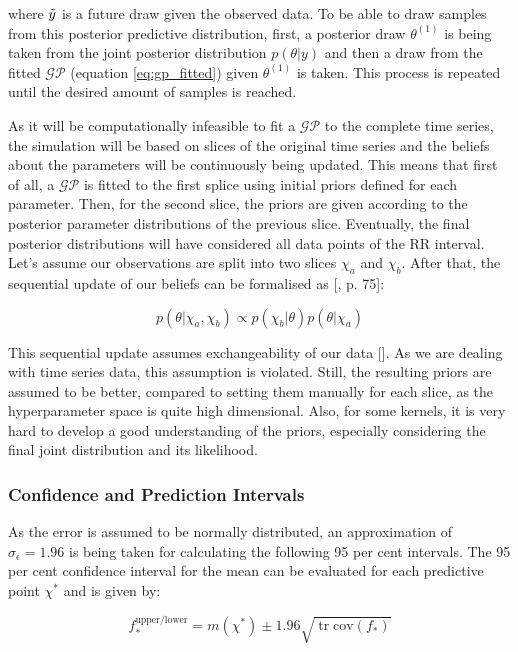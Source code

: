 \documentclass[11pt]{scrartcl}
\DeclareMathOperator{\tr}{tr}
\begin{document}
where $\Tilde{y}$ is a future draw given the observed data. To be able to draw samples from this posterior predictive distribution, first, a posterior draw $\theta^{(1)}$ is being taken from the joint posterior distribution $p(\theta|y)$ and then a draw from the fitted $\mathcal{GP}$ (equation \ref{eq:gp_fitted}) given $\theta^{(1)}$ is taken. This process is repeated until the desired amount of samples is reached.

As it will be computationally infeasible to fit a $\mathcal{GP}$ to the complete time series, the simulation will be based on slices of the original time series and the beliefs about the parameters will be continuously being updated. This means that first of all, a $\mathcal{GP}$ is fitted to the first splice using initial priors defined for each parameter. Then, for the second slice, the priors are given according to the posterior parameter distributions of the previous slice. Eventually, the final posterior distributions will have considered all data points of the RR interval. Let's assume our observations are split into two slices $\chi_a$ and $\chi_b$. After that, the sequential update of our beliefs can be formalised as [\cite{murphy2013machine}, p. 75]:

\begin{equation}
    p(\theta|\chi_a,\chi_b) \propto p(\chi_b|\theta)p(\theta|\chi_a)
\end{equation}

This sequential update assumes exchangeability of our data [\cite{Bernardo2001TheCO}]. As we are dealing with time series data, this assumption is violated. Still, the resulting priors are assumed to be better, compared to setting them manually for each slice, as the hyperparameter space is quite high dimensional. Also, for some kernels, it is very hard to develop a good understanding of the priors, especially considering the final joint distribution and its likelihood.

\subsubsection{Confidence and Prediction Intervals}

As the error is assumed to be normally distributed, an approximation of $\sigma_{\epsilon}=1.96$ is being taken for calculating the following 95 per cent intervals. The 95 per cent confidence interval for the mean can be evaluated for each predictive point $\chi^\ast$ and is given by:

\begin{equation}
    f_\ast^{\text{upper/lower}} = m(\chi^\ast) \pm 1.96 \sqrt{\tr \text{cov}(f_\ast)}
\end{equation}
\end{document}
